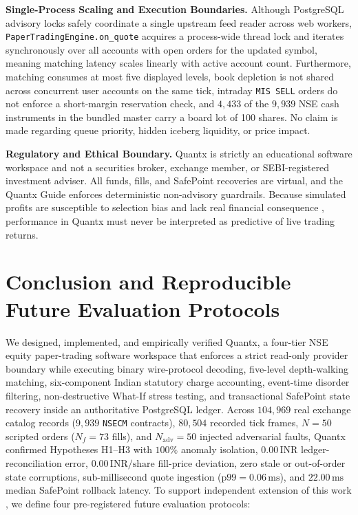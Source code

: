 \documentclass[journal,onecolumn,10pt]{IEEEtran}
\newcommand{\thinunit}[2]{#1\,\text{#2}}
\begin{document}
\textbf{Single-Process Scaling and Execution Boundaries.} Although PostgreSQL advisory locks safely coordinate a single upstream feed reader across web workers, \texttt{PaperTradingEngine.on\_quote} acquires a process-wide thread lock and iterates synchronously over all accounts with open orders for the updated symbol, meaning matching latency scales linearly with active account count. Furthermore, matching consumes at most five displayed levels, book depletion is not shared across concurrent user accounts on the same tick, intraday \texttt{MIS SELL} orders do not enforce a short-margin reservation check, and $4{,}433$ of the $9{,}939$ NSE cash instruments in the bundled master carry a board lot of 100 shares. No claim is made regarding queue priority, hidden iceberg liquidity, or price impact.

\textbf{Regulatory and Ethical Boundary.} Quantx is strictly an educational software workspace and not a securities broker, exchange member, or SEBI-registered investment adviser. All funds, fills, and SafePoint recoveries are virtual, and the Quantx Guide enforces deterministic non-advisory guardrails. Because simulated profits are susceptible to selection bias and lack real financial consequence \cite{bailey2014}, performance in Quantx must never be interpreted as predictive of live trading returns.

\section{Conclusion and Reproducible Future Evaluation Protocols}

We designed, implemented, and empirically verified Quantx, a four-tier NSE equity paper-trading software workspace that enforces a strict read-only provider boundary while executing binary wire-protocol decoding, five-level depth-walking matching, six-component Indian statutory charge accounting, event-time disorder filtering, non-destructive What-If stress testing, and transactional SafePoint state recovery inside an authoritative PostgreSQL ledger. Across $104{,}969$ real exchange catalog records ($9{,}939$ \texttt{NSECM} contracts), $80{,}504$ recorded tick frames, $N=50$ scripted orders ($N_f=73$ fills), and $N_{\mathrm{adv}}=50$ injected adversarial faults, Quantx confirmed Hypotheses H1--H3 with $100\%$ anomaly isolation, $\thinunit{0.00}{INR}$ ledger-reconciliation error, $\thinunit{0.00}{INR/share}$ fill-price deviation, zero stale or out-of-order state corruptions, sub-millisecond quote ingestion ($\text{p99}=\thinunit{0.06}{ms}$), and $\thinunit{22.00}{ms}$ median SafePoint rollback latency. To support independent extension of this work \cite{peng2011}, we define four pre-registered future evaluation protocols:
\end{document}
